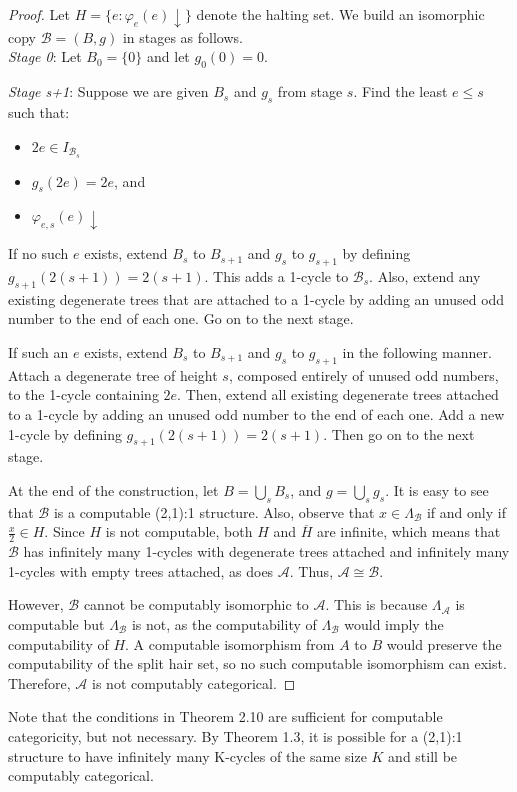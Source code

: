\documentclass[12pt]{article}
\begin{document}
\begin{proof}
Let $H= \{e: \varphi_e(e)\downarrow\}$ denote the halting set. We build an isomorphic copy $\mathcal{B} = (B,g)$ in stages as follows.\\

\emph{Stage 0}: Let $B_0=\{0\}$ and let $g_0(0)=0$.

\emph{Stage s+1}: Suppose we are given $B_s$ and $g_s$ from stage $s$. Find the least $e \leq s$ such that:\\

\begin{itemize}
\item $2e \in I_{\mathcal{B}_s}$
\item $g_s(2e)=2e$, and
\item $\varphi_{e,s}(e)\downarrow$
\end{itemize}

If no such $e$ exists, extend $B_s$ to $B_{s+1}$ and $g_s$ to $g_{s+1}$ by defining $g_{s+1}(2(s+1))=2(s+1)$. This adds a 1-cycle to $\mathcal{B}_s$. Also, extend any existing degenerate trees that are attached to a 1-cycle by adding an unused odd number to the end of each one. Go on to the next stage.

If such an $e$ exists, extend $B_s$ to $B_{s+1}$ and $g_s$ to $g_{s+1}$ in the following manner. Attach a degenerate tree of height $s$, composed entirely of unused odd numbers, to the 1-cycle containing $2e$. Then, extend all existing degenerate trees attached to a 1-cycle by adding an unused odd number to the end of each one. Add a new 1-cycle by defining $g_{s+1}(2(s+1))=2(s+1)$. Then go on to the next stage. 

At the end of the construction, let $B = \bigcup_s B_s$, and $g=\bigcup_s g_s$. It is easy to see that $\mathcal{B}$ is a computable (2,1):1 structure. Also, observe that $x \in \Lambda_\mathcal{B}$ if and only if $\frac{x}{2} \in H$. Since $H$ is not computable, both $H$ and $\overline H$ are infinite, which means that $\mathcal{B}$ has infinitely many 1-cycles with degenerate trees attached and infinitely many 1-cycles with empty trees attached, as does $\mathcal{A}$. Thus, $\mathcal{A} \cong \mathcal{B}$.

However, $\mathcal{B}$ cannot be computably isomorphic to $\mathcal{A}$. This is because $\Lambda_\mathcal{A}$ is computable but $\Lambda_\mathcal{B}$ is not, as the computability of $\Lambda_\mathcal{B}$ would imply the computability of $H$. A computable isomorphism from $A$ to $B$ would preserve the computability of the split hair set, so no such computable isomorphism can exist. Therefore, $\mathcal{A}$ is not computably categorical.
\end{proof}

Note that the conditions in Theorem 2.10 are sufficient for computable categoricity, but not necessary. By Theorem 1.3, it is possible for a (2,1):1 structure to have infinitely many K-cycles of the same size $K$ and still be computably categorical.
\end{document}

